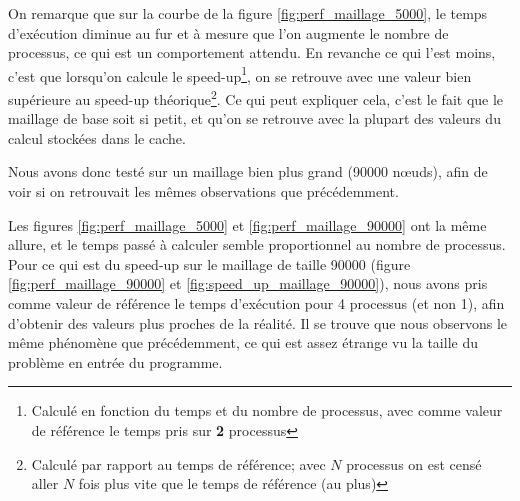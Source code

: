 \documentclass[a4paper,11pt]{article}
\begin{document}
\noindent On remarque que sur la courbe de la figure \ref{fig:perf_maillage_5000}, le temps d'exécution diminue au fur et à mesure que l'on augmente le nombre de processus, ce qui est un comportement attendu. En revanche ce qui l'est moins, c'est que lorsqu'on calcule le speed-up\footnote{Calculé en fonction du temps et du nombre de processus, avec comme valeur de référence le temps pris sur \textbf{2} processus}, on se retrouve avec une valeur bien supérieure au speed-up théorique\footnote{Calculé par rapport au temps de référence; avec $N$ processus on est censé aller $N$ fois plus vite que le temps de référence (au plus)}. Ce qui peut expliquer cela, c'est le fait que le maillage de base soit si petit, et qu'on se retrouve avec la plupart des valeurs du calcul stockées dans le cache.

\noindent Nous avons donc testé sur un maillage bien plus grand (90000 n\oe uds), afin de voir si on retrouvait les mêmes observations que précédemment. 

\noindent Les figures \ref{fig:perf_maillage_5000} et \ref{fig:perf_maillage_90000} ont la même allure, et le temps passé à calculer semble proportionnel au nombre de processus. Pour ce qui est du speed-up sur le maillage de taille 90000 (figure \ref{fig:perf_maillage_90000} et \ref{fig:speed_up_maillage_90000}), nous avons pris comme valeur de référence le temps d'exécution pour 4 processus (et non 1), afin d'obtenir des valeurs plus proches de la réalité. Il se trouve que nous observons le même phénomène que précédemment, ce qui est assez étrange vu la taille du problème en entrée du programme.
\end{document}
